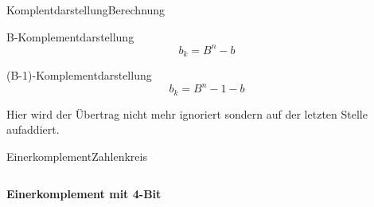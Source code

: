 \documentclass[xelatex,aspectratio=169]{beamer}
\begin{document}
\begin{frame}{Komplentdarstellung}{Berechnung}
  \begin{block}{B-Komplementdarstellung}
    \[b_k = B^n  - b\]
  \end{block}
  \begin{block}{(B-1)-Komplementdarstellung}
    \[b_k = B^n -1 - b\]

    Hier wird der Übertrag nicht mehr ignoriert sondern auf der letzten Stelle aufaddiert.
  \end{block}
\end{frame}

\begin{frame}{Einerkomplement}{Zahlenkreis}
  \begin{columns}
    \begin{column}{0.5\textwidth}
      \centering
      \textbf{Einerkomplement mit 4-Bit}
\end{column}
\end{columns}
\end{frame}
\end{document}
